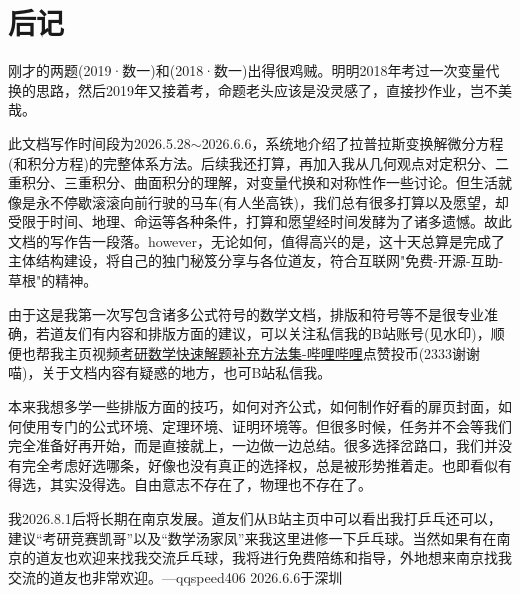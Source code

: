 \documentclass[12pt]{report}
\begin{document}
	\chapter*{后记}
     刚才的两题(2019·数一)和(2018·数一)出得很鸡贼。明明2018年考过一次变量代换的思路，然后2019年又接着考，命题老头应该是没灵感了，直接抄作业，岂不美哉。
     
     此文档写作时间段为2026.5.28$\sim$2026.6.6，系统地介绍了拉普拉斯变换解微分方程(和积分方程)的完整体系方法。后续我还打算，再加入我从几何观点对定积分、二重积分、三重积分、曲面积分的理解，对变量代换和对称性作一些讨论。但生活就像是永不停歇滚滚向前行驶的马车(有人坐高铁)，我们总有很多打算以及愿望，却受限于时间、地理、命运等各种条件，打算和愿望经时间发酵为了诸多遗憾。故此文档的写作告一段落。however，无论如何，值得高兴的是，这十天总算是完成了主体结构建设，将自己的独门秘笈分享与各位道友，符合互联网"免费-开源-互助-草根"的精神。
     
     由于这是我第一次写包含诸多公式符号的数学文档，排版和符号等不是很专业准确，若道友们有内容和排版方面的建议，可以关注私信我的B站账号(见水印)，顺便也帮我主页视频\href{https://b23.tv/R8F4RW5}{考研数学快速解题补充方法集-哔哩哔哩}点赞投币(2333谢谢喵)，关于文档内容有疑惑的地方，也可B站私信我。
     
     本来我想多学一些排版方面的技巧，如何对齐公式，如何制作好看的扉页封面，如何使用专门的公式环境、定理环境、证明环境等。但很多时候，任务并不会等我们完全准备好再开始，而是直接就上，一边做一边总结。很多选择岔路口，我们并没有完全考虑好选哪条，好像也没有真正的选择权，总是被形势推着走。也即看似有得选，其实没得选。自由意志不存在了，物理也不存在了。
     
     我2026.8.1后将长期在南京发展。道友们从B站主页中可以看出我打乒乓还可以，建议“考研竞赛凯哥”以及“数学汤家凤”来我这里进修一下乒乓球。当然如果有在南京的道友也欢迎来找我交流乒乓球，我将进行免费陪练和指导，外地想来南京找我交流的道友也非常欢迎。\hspace{2em}—qqspeed406 \hspace{1em}2026.6.6于深圳
     
	
\end{document}
